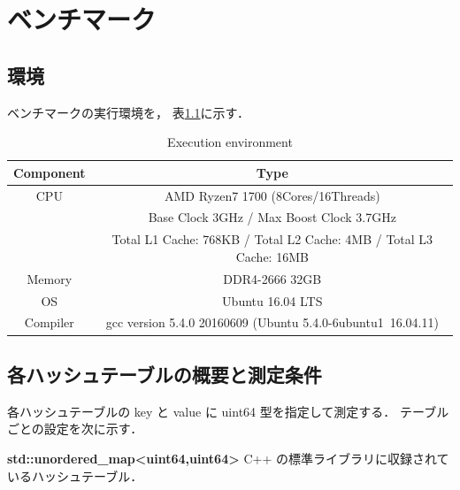 \chapter{ベンチマーク}
\label{chap_Results}

\section{環境}

ベンチマークの実行環境を，
表\ref{table_env}に示す．

\begin{table}[hbtp]
  \label{table_env}
  \begin{center}
    \caption{Execution environment}
    \begin{tabular}{cc} \hline
      Component & Type \rule[0pt]{0pt}{0pt} \\ \hline
      CPU & AMD Ryzen7 1700 (8Cores/16Threads) \rule[0pt]{0pt}{0pt} \\ 
      & Base Clock 3GHz / Max Boost Clock 3.7GHz \rule[0pt]{0pt}{0pt} \\
      & Total L1 Cache: 768KB / Total L2 Cache: 4MB / Total L3 Cache: 16MB \\
      Memory & DDR4-2666 32GB \rule[0pt]{0pt}{0pt} \\
      OS & Ubuntu 16.04 LTS \rule[0pt]{0pt}{0pt} \\
      Compiler & gcc version 5.4.0 20160609 (Ubuntu 5.4.0-6ubuntu1~16.04.11) \rule[0pt]{0pt}{0pt} \\ \hline
    \end{tabular}
  \end{center}
\end{table}


\section{各ハッシュテーブルの概要と測定条件}
各ハッシュテーブルの key と value に uint64 型を指定して測定する．
テーブルごとの設定を次に示す．
\leavevmode \newline

%
{\bf std::unordered\_map<uint64,uint64>}
\samepage\newline\indent
C++ の標準ライブラリに収録されているハッシュテーブル．
\leavevmode \newline

